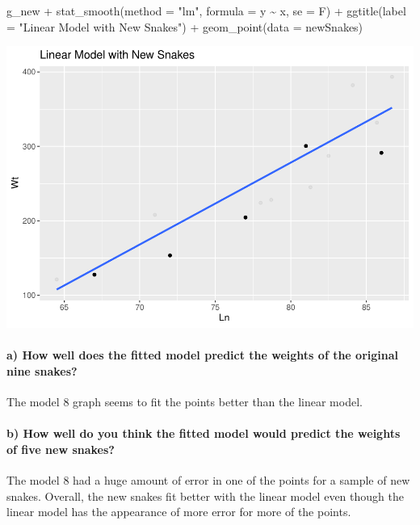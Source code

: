 \documentclass[
]{article}
\newenvironment{Shaded}{\begin{snugshade}}{\end{snugshade}}
\newcommand{\AttributeTok}[1]{\textcolor[rgb]{0.77,0.63,0.00}{#1}}
\newcommand{\FunctionTok}[1]{\textcolor[rgb]{0.00,0.00,0.00}{#1}}
\newcommand{\NormalTok}[1]{#1}
\newcommand{\SpecialCharTok}[1]{\textcolor[rgb]{0.00,0.00,0.00}{#1}}
\newcommand{\StringTok}[1]{\textcolor[rgb]{0.31,0.60,0.02}{#1}}
\begin{document}
\begin{Shaded}
\begin{Highlighting}[]
\NormalTok{g\_new }\SpecialCharTok{+} \FunctionTok{stat\_smooth}\NormalTok{(}\AttributeTok{method =} \StringTok{"lm"}\NormalTok{,}
                    \AttributeTok{formula =}\NormalTok{ y }\SpecialCharTok{\textasciitilde{}}\NormalTok{ x,}
                    \AttributeTok{se =}\NormalTok{ F) }\SpecialCharTok{+}
  \FunctionTok{ggtitle}\NormalTok{(}\AttributeTok{label =} \StringTok{"Linear Model with New Snakes"}\NormalTok{) }\SpecialCharTok{+}
  \FunctionTok{geom\_point}\NormalTok{(}\AttributeTok{data =}\NormalTok{ newSnakes)}
\end{Highlighting}
\end{Shaded}

\includegraphics{Class_Exercises_ClassNotes_5_files/figure-latex/unnamed-chunk-54-1.pdf}

\hypertarget{a-how-well-does-the-fitted-model-predict-the-weights-of-the-original-nine-snakes}{%
\paragraph{a) How well does the fitted model predict the weights of the
original nine
snakes?}\label{a-how-well-does-the-fitted-model-predict-the-weights-of-the-original-nine-snakes}}

\hfill\break
The model 8 graph seems to fit the points better than the linear model.

\hypertarget{b-how-well-do-you-think-the-fitted-model-would-predict-the-weights-of-five-new-snakes}{%
\paragraph{b) How well do you think the fitted model would predict the
weights of five new
snakes?}\label{b-how-well-do-you-think-the-fitted-model-would-predict-the-weights-of-five-new-snakes}}

\hfill\break
The model 8 had a huge amount of error in one of the points for a sample
of new snakes. Overall, the new snakes fit better with the linear model
even though the linear model has the appearance of more error for more
of the points.
\end{document}
